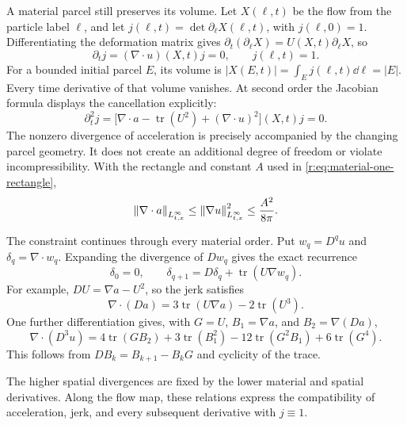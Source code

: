 A material parcel still preserves its volume. Let \(X(\ell,t)\) be the
flow from the particle label \(\ell\), and let
\(j(\ell,t)=\det\partial_\ell X(\ell,t)\), with \(j(\ell,0)=1\).
Differentiating the deformation matrix gives
\(\partial_t(\partial_\ell X)=U(X,t)\partial_\ell X\), so
\[
 \partial_tj=(\nabla\cdot u)(X,t)j=0,\qquad j(\ell,t)=1.
\]
For a bounded initial parcel \(E\), its volume is
\(|X(E,t)|=\int_E j(\ell,t)\dd\ell=|E|\).
Every time derivative of that volume vanishes. At second order the
Jacobian formula displays the cancellation explicitly:
\begin{equation}
 \partial_t^2j
 =\bigl[\nabla\cdot a-\operatorname{tr}(U^2)
                 +(\nabla\cdot u)^2\bigr](X,t)j=0.
 \label{r:eq:parcel-volume}
\end{equation}
The nonzero divergence of acceleration is precisely accompanied by
the changing parcel geometry. It does not create an additional degree
of freedom or violate incompressibility.
With the rectangle and constant \(A\) used in
\eqref{r:eq:material-one-rectangle},
\[
 \left\lVert \nabla\cdot a\right\rVert_{L^\infty_{t,x}}
 \le\left\lVert \nabla u\right\rVert_{L^\infty_{t,x}}^2
 \le\frac{A^2}{8\pi}.
\]

The constraint continues through every material order. Put
\(w_q=D^qu\) and \(\delta_q=\nabla\cdot w_q\). Expanding the
divergence of \(Dw_q\) gives the exact recurrence
\begin{equation}
 \delta_0=0,\qquad
 \delta_{q+1}=D\delta_q+\operatorname{tr}(U\nabla w_q).
 \label{r:eq:material-incompressibility}
\end{equation}
For example, \(DU=\nabla a-U^2\), so the jerk satisfies
\[
 \nabla\cdot(Da)
 =3\operatorname{tr}(U\nabla a)-2\operatorname{tr}(U^3).
\]
One further differentiation gives, with \(G=U\),
\(B_1=\nabla a\), and \(B_2=\nabla(Da)\),
\[
 \nabla\cdot(D^3u)
 =4\operatorname{tr}(GB_2)+3\operatorname{tr}(B_1^2)
 -12\operatorname{tr}(G^2B_1)+6\operatorname{tr}(G^4).
\]
This follows from \(DB_k=B_{k+1}-B_kG\) and cyclicity of the trace.

The higher spatial divergences are fixed by the lower material and
spatial derivatives. Along the flow map, these relations express the
compatibility of acceleration, jerk, and every subsequent derivative
with \(j\equiv1\).

